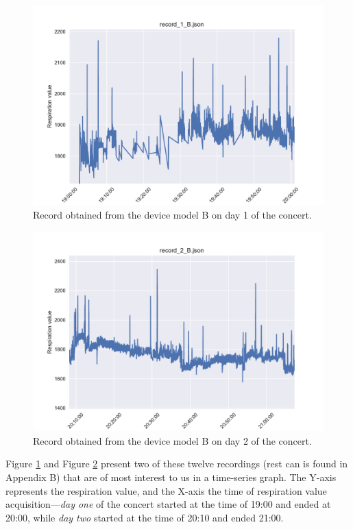 \begin{figure}[!h]
    \centering
    \includegraphics[scale=0.5]{images/Record_1_B.pdf}
    \caption{Record obtained from the device model B on day 1 of the concert.}
    \label{fig:day_1}
\end{figure}

\begin{figure}[!h]
    \centering
    \includegraphics[scale=0.5]{images/Record_2_B.pdf}
    \caption{Record obtained from the device model B on day 2 of the concert.}
    \label{fig:day_2}
\end{figure}



Figure \ref{fig:day_1} and Figure \ref{fig:day_2} present two of these twelve recordings (rest can is found in Appendix B) that are of most interest to us in a time-series graph. The Y-axis represents the respiration value, and the X-axis the time of respiration value acquisition---\textit{day one} of the concert started at the time of 19:00 and ended at 20:00, while \textit{day two} started at the time of 20:10 and ended 21:00.

